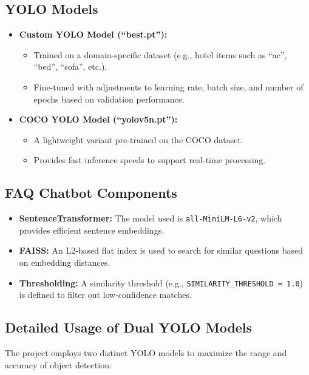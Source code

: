 \documentclass[12pt]{article}
\begin{document}
\subsection{YOLO Models}

\begin{itemize}
    \item \textbf{Custom YOLO Model (``best.pt''):}
    \begin{itemize}
        \item Trained on a domain-specific dataset (e.g., hotel items such as ``ac'', ``bed'', ``sofa'', etc.).
        \item Fine-tuned with adjustments to learning rate, batch size, and number of epochs based on validation performance.
    \end{itemize}
    \item \textbf{COCO YOLO Model (``yolov5n.pt''):}
    \begin{itemize}
        \item A lightweight variant pre-trained on the COCO dataset.
        \item Provides fast inference speeds to support real-time processing.
    \end{itemize}
\end{itemize}

\subsection{FAQ Chatbot Components}

\begin{itemize}
    \item \textbf{SentenceTransformer:} The model used is \texttt{all-MiniLM-L6-v2}, which provides efficient sentence embeddings.
    \item \textbf{FAISS:} An L2-based flat index is used to search for similar questions based on embedding distances.
    \item \textbf{Thresholding:} A similarity threshold (e.g., \texttt{SIMILARITY\_THRESHOLD = 1.0}) is defined to filter out low-confidence matches.
\end{itemize}

\subsection{Detailed Usage of Dual YOLO Models}

The project employs two distinct YOLO models to maximize the range and accuracy of object detection:
\end{document}
